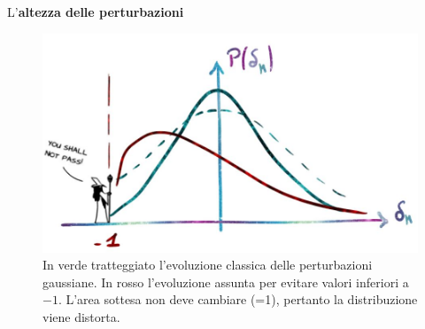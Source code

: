 \vspace{1em}
L'\textbf{altezza delle perturbazioni} 
\begin{figure}[h]
    \centering
    \includegraphics[width=.65 \textwidth]{Pictures/8/pdfevol.jpg}
    \vspace*{-1em}
    \caption{In verde tratteggiato l'evoluzione classica delle perturbazioni gaussiane. In rosso l'evoluzione assunta per evitare valori inferiori a $-1$. L'area sottesa non deve cambiare (=1), pertanto la distribuzione viene distorta.}\label{fig8:ultima}
\end{figure}

